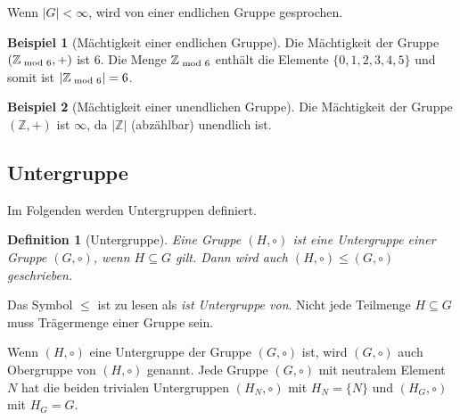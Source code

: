 \documentclass[12pt,a4paper, usenames, dvipsnames]{article}
\theoremstyle{mystyle}
\newtheorem{definition}{Definition}
\theoremstyle{definition}
\newtheorem{bsp}{Beispiel}[definition]
\begin{document}
Wenn $|G| < \infty$, wird von einer endlichen Gruppe gesprochen.

\begin{bsp}[Mächtigkeit einer endlichen Gruppe]

Die Mächtigkeit der Gruppe $(\mathbb{Z}_{\hspace*{-0.3em}\mod 6}, +)$ ist $6$. Die Menge $\mathbb{Z}_{\hspace*{-0.3em}\mod 6}$ enthält die Elemente $\{0,1,2,3,4,5 \}$ und somit ist $| \mathbb{Z}_{\hspace*{-0.3em}\mod 6} | = 6$.

\end{bsp}

\begin{bsp}[Mächtigkeit einer unendlichen Gruppe]

Die Mächtigkeit der Gruppe $(\mathbb{Z}, +)$ ist $\infty$, da $|\mathbb{Z}|$ (abzählbar) unendlich ist.

\end{bsp}

%
%
%
%
%
%
%
%
%
%
\subsection{Untergruppe} 
\label{Abschnitt_Untergruppe}

Im Folgenden werden Untergruppen definiert.


\begin{definition}[Untergruppe]
Eine Gruppe $(H, \circ)$ ist eine Untergruppe einer Gruppe $(G, \circ)$, wenn $H \subseteq G$ gilt. Dann wird auch $(H, \circ) \leqslant (G, \circ)$ geschrieben. 
\end{definition}

Das Symbol $\leqslant$ ist zu lesen als \textit{ist Untergruppe von}. Nicht jede Teilmenge $H \subseteq G$ muss Trägermenge einer Gruppe sein.

Wenn $(H, \circ)$ eine Untergruppe der Gruppe $(G, \circ)$ ist, wird $(G, \circ)$ auch Obergruppe von $(H, \circ)$ genannt.
Jede Gruppe $(G, \circ)$ mit neutralem Element $N$ hat die beiden trivialen Untergruppen $(H_N, \circ)$ mit ${H_N = \{N\}}$ und $(H_G, \circ)$ mit $H_G=G$.
\end{document}

